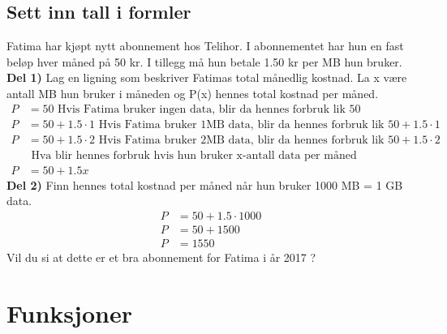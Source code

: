 \documentclass[12pt,twoside,onecolumn]{article}
\begin{document}
\subsection*{Sett inn tall i formler}
\begin{Exercise}
Fatima har kjøpt nytt abonnement hos Telihor. I abonnementet har hun en fast beløp hver måned på 50 kr. I tillegg må hun betale 1.50 kr per MB hun bruker. 
\newline\newline
\textbf{Del 1)} Lag en ligning som beskriver Fatimas total månedlig kostnad. La x være antall MB hun bruker i måneden og P(x) hennes total kostnad per måned.
\begin{align}
P &= 50 \text{ Hvis Fatima bruker ingen data, blir da hennes forbruk lik 50}\\ 
P &= 50 + 1.5\cdot1\text{ Hvis Fatima bruker 1MB data, blir da hennes forbruk lik $50 + 1.5\cdot1$}\\ 
P &= 50 + 1.5\cdot2\text{ Hvis Fatima bruker 2MB data, blir da hennes forbruk lik $50 + 1.5\cdot2$}\\ 
&\text{ Hva blir hennes forbruk hvis hun bruker x-antall data per måned} \nonumber\\
P &= 50 + 1.5x
\end{align}
\newline
\textbf{Del 2)}
Finn hennes total kostnad per måned når hun bruker 1000 MB = 1 GB data.
\begin{align}
P &= 50 + 1.5\cdot1000\\
P &= 50 + 1500\\
P &= 1550
\end{align}
Vil du si at dette er et bra abonnement for Fatima i år 2017 ?
\end{Exercise}

\section*{Funksjoner}
\end{document}
